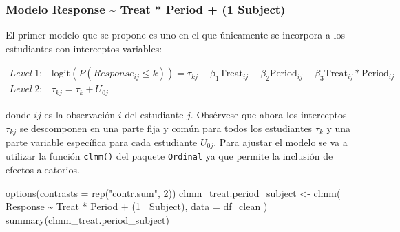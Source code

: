 \documentclass[
  12pt,
  a4paper,
  extrafontsizes,
  onecolumn,
  openright,
  table]{memoir}
\newenvironment{Shaded}{\begin{snugshade}}{\end{snugshade}}
\newcommand{\AttributeTok}[1]{\textcolor[rgb]{0.40,0.45,0.13}{#1}}
\newcommand{\DecValTok}[1]{\textcolor[rgb]{0.68,0.00,0.00}{#1}}
\newcommand{\FunctionTok}[1]{\textcolor[rgb]{0.28,0.35,0.67}{#1}}
\newcommand{\NormalTok}[1]{\textcolor[rgb]{0.00,0.23,0.31}{#1}}
\newcommand{\OtherTok}[1]{\textcolor[rgb]{0.00,0.23,0.31}{#1}}
\newcommand{\SpecialCharTok}[1]{\textcolor[rgb]{0.37,0.37,0.37}{#1}}
\newcommand{\StringTok}[1]{\textcolor[rgb]{0.13,0.47,0.30}{#1}}
\begin{document}
\hypertarget{modelo-response-treat-period-1-subject}{%
\subsubsection{Modelo Response \textasciitilde{} Treat * Period + (1
\textbar{} Subject)}\label{modelo-response-treat-period-1-subject}}

El primer modelo que se propone es uno en el que únicamente se incorpora
a los estudiantes con interceptos variables:

\small

\[
\begin{aligned}
Level\ 1: & \text{logit}(P(Response_{ij} \leq k)) = \tau_{kj} - \beta_1 \text{Treat}_{ij} - \beta_2 \text{Period}_{ij} - \beta_3 \text{Treat}_{ij} * \text{Period}_{ij} \\
Level\ 2: & \tau_{kj}  =  \tau_{k} + U_{0j}
\end{aligned}
\]

\normalsize

donde \(ij\) es la observación \(i\) del estudiante \(j\). Obsérvese que
ahora los interceptos \(\tau_{kj}\) se descomponen en una parte fija y
común para todos los estudiantes \(\tau_{k}\) y una parte variable
específica para cada estudiante \(U_{0j}\). Para ajustar el modelo se va
a utilizar la función \texttt{clmm()} del paquete \texttt{Ordinal} ya
que permite la inclusión de efectos aleatorios.

\scriptsize

\begin{Shaded}
\begin{Highlighting}[]
\FunctionTok{options}\NormalTok{(}\AttributeTok{contrasts =} \FunctionTok{rep}\NormalTok{(}\StringTok{"contr.sum"}\NormalTok{, }\DecValTok{2}\NormalTok{))}
\NormalTok{clmm\_treat.period\_subject }\OtherTok{\textless{}{-}} \FunctionTok{clmm}\NormalTok{(}
\NormalTok{    Response }\SpecialCharTok{\textasciitilde{}}\NormalTok{ Treat }\SpecialCharTok{*}\NormalTok{ Period }\SpecialCharTok{+}\NormalTok{ (}\DecValTok{1} \SpecialCharTok{|}\NormalTok{ Subject),}
    \AttributeTok{data =}\NormalTok{ df\_clean}
\NormalTok{)}
\FunctionTok{summary}\NormalTok{(clmm\_treat.period\_subject)}
\end{Highlighting}
\end{Shaded}
\end{document}
